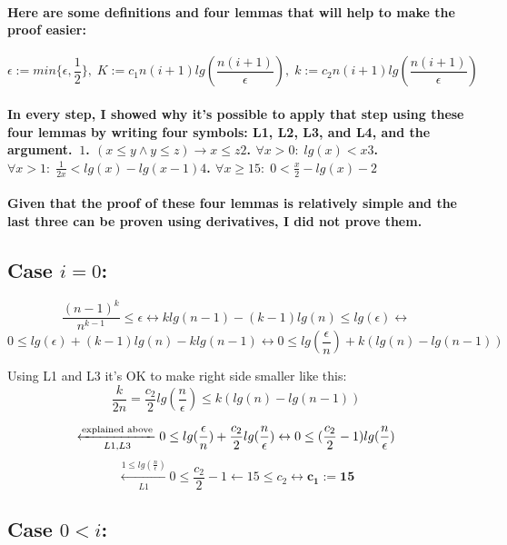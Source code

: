 \documentclass[oneside]{book}
\newcommand{\myparagraph}[1]{\paragraph{\textnormal{#1}}}
\begin{document}
\myparagraph{
Here are some definitions and four lemmas that will help to make the proof easier:
}

$$\epsilon:=min\{\epsilon, \frac{1}{2}\}, \; K:=c_1n(i+1)lg(\frac{n(i+1)}{\epsilon}),\; k:=c_2n(i+1)lg(\frac{n(i+1)}{\epsilon})$$

\myparagraph{
In every step, I showed why it's possible to apply that step using these four lemmas by writing four symbols: L1, L2, L3, and L4, and the argument.\newline \, \newline $1$. $(x \le y \land y \le z) \rightarrow x \le z$\newline $2$. $\forall x > 0: \; lg(x) < x$\newline $3$. $\forall x > 1: \; \frac{1}{2x} < lg(x)-lg(x-1)$\newline $4$. $\forall x \ge 15: \; 0 < \frac{x}{2} - lg(x) - 2$
}

\myparagraph{
Given that the proof of these four lemmas is relatively simple and the last three can be proven using derivatives, I did not prove them.
}

\subsection{Case $i = 0$:}

$$\frac{(n-1)^k}{n^{k-1}} \le \epsilon\leftrightarrow  k lg(n-1) - (k-1) lg(n) \le lg(\epsilon) \leftrightarrow $$
$$0 \le lg(\epsilon) + (k-1) lg(n) - k lg(n-1) \leftrightarrow 0 \le lg(\frac{\epsilon}{n}) + k(lg(n) - lg(n - 1))$$
\begin{tcolorbox}
Using L1 and L3 it's OK to make right side smaller like this:\newline
$$\frac{k}{2n} = \frac{c_2}{2}lg(\frac{n}{\epsilon}) \le k(lg(n) - lg(n-1))$$
\end{tcolorbox}
$$\xleftarrow[L1, L3]{\textnormal{explained above}} 0 \le lg(\frac{\epsilon}{n}) + \frac{c_2}{2}lg(\frac{n}{\epsilon}) \leftrightarrow 0 \le (\frac{c_2}{2} - 1)lg(\frac{n}{\epsilon})$$
$$\xleftarrow[L1]{1 \le lg(\frac{n}{\epsilon})} 0 \le \frac{c_2}{2} - 1 \leftarrow 15 \le c_2 \leftrightarrow \mathbf{c_1 := 15}$$

\subsection{Case $0 < i$:}
\end{document}
